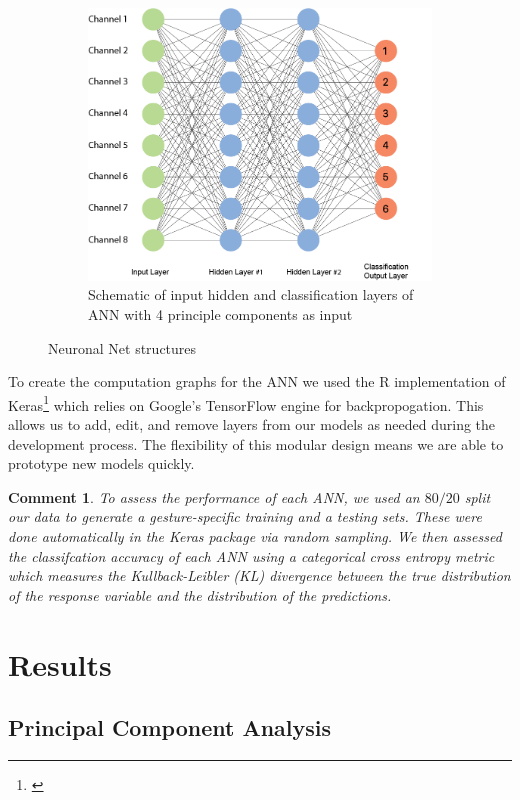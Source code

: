 \documentclass{article}
\newtheorem{com}{Comment}
\begin{document}
\begin{figure}[h]
\begin{subfigure}{.6\textwidth}
  \includegraphics[width=.9\linewidth]{Graphics/2-layer-NN}
  \caption{Schematic of input hidden and classification layers of ANN with 4 principle components as input}
  \label{fig:2Layer}
\end{subfigure}
\caption{Neuronal Net structures}
\label{gig:Model}
\end{figure}

To create the computation graphs for the ANN we used the R implementation of Keras\footnote{\cite{Keras}} which relies on Google's TensorFlow engine for backpropogation. This allows us to add, edit, and remove layers from our models as needed during the development process. The flexibility of this modular design means we are able to prototype new models quickly.

\begin{com}
To assess the performance of each ANN, we used an $80/20$ split our data to generate a gesture-specific training and a testing sets. These were done automatically in the Keras package via random sampling. We then assessed the classifcation accuracy of each ANN using a categorical cross entropy metric which measures the \textit{Kullback-Leibler} (KL) divergence between the true distribution of the response variable and the distribution of the predictions.
\end{com}

\section{Results}

\subsection{Principal Component Analysis}
\end{document}
